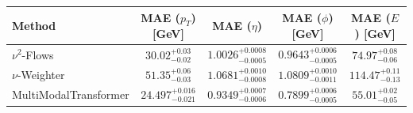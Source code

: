     \begin{tabular}{lcccc}
        \toprule
        Method & MAE ($p_T$) [GeV] & MAE ($\eta$) & MAE ($\phi$) [GeV] & MAE ($E$) [GeV] \\
        \midrule
        $\nu^2$-Flows & $30.02^{+0.03}_{-0.02}$ & $1.0026^{+0.0008}_{-0.0005}$ & $0.9643^{+0.0006}_{-0.0005}$ & $74.97^{+0.08}_{-0.06}$ \\
        $\nu$-Weighter & $51.35^{+0.06}_{-0.03}$ & $1.0681^{+0.0010}_{-0.0008}$ & $1.0809^{+0.0010}_{-0.0011}$ & $114.47^{+0.11}_{-0.13}$ \\
        MultiModalTransformer & $24.497^{+0.016}_{-0.021}$ & $0.9349^{+0.0007}_{-0.0006}$ & $0.7899^{+0.0006}_{-0.0005}$ & $55.01^{+0.02}_{-0.05}$ \\
        \bottomrule
    \end{tabular}